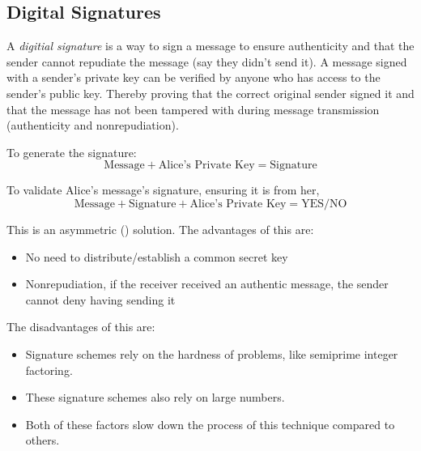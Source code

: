 \subsection{Digital Signatures}\label{subsec:Digital_Signatures}
\begin{definition}
  A \emph{digitial signature} is a way to sign a message to ensure authenticity and that the sender cannot repudiate the message (say they didn't send it).
  A message signed with a sender’s private key can be verified by anyone who has access to the sender’s public key.
  Thereby proving that the correct original sender signed it and that the message has not been tampered with during message transmission (authenticity and nonrepudiation).

  To generate the signature:
  \begin{equation}\label{eq:Digital_Signature-Generate}
    \text{Message} + \text{Alice's Private Key} = \text{Signature}
  \end{equation}

  To validate Alice's message's signature, ensuring it is from her,
  \begin{equation}\label{eq:Digital_Signature-Validate}
    \text{Message} + \text{Signature} + \text{Alice's Private Key} = \text{YES/NO}
  \end{equation}

\end{definition}

This is an asymmetric () solution.
The advantages of this are:
\begin{itemize}[noitemsep]
\item No need to distribute/establish a common secret key
\item Nonrepudiation, if the receiver received an authentic message, the sender cannot deny having sending it
\end{itemize}

The disadvantages of this are:
\begin{itemize}[noitemsep]
\item Signature schemes rely on the hardness of problems, like semiprime integer factoring.
\item These signature schemes also rely on large numbers.
\item Both of these factors slow down the process of this technique compared to others.
\end{itemize}


